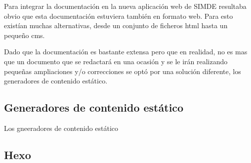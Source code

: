 Para integrar la documentación en la nueva aplicación web de SIMDE resultaba obvio que esta documentación
estuviera también en formato web. Para esto existían muchas alternativas, desde un conjunto de ficheros
html hasta un pequeño cms. 

Dado que la documentación es bastante extensa pero que en realidad, no es mas que un documento 
que se redactará en una ocasión y se le irán realizando pequeñas ampliaciones y/o correcciones
se optó por una solución diferente, los generadores de contenido estático.

\subsection{Generadores de contenido estático}

Los gneeradores de contenido estático 

\subsection{Hexo}



